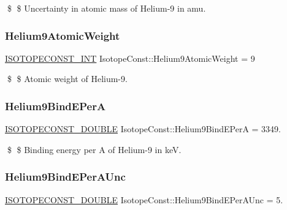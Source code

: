 \$ \$ Uncertainty in atomic mass of Helium-\/9 in amu. \mbox{\label{group___isotope_const-_helium-_he9_ga535bbec4b979be492d664d698eecff00}} 
\subsubsection{\texorpdfstring{Helium9\+Atomic\+Weight}{Helium9AtomicWeight}}
{\footnotesize\ttfamily \mbox{\hyperlink{group___isotope_const-_macros_ga5f18360b3e99483a35c32d789e62621c}{I\+S\+O\+T\+O\+P\+E\+C\+O\+N\+S\+T\+\_\+\+I\+NT}} Isotope\+Const\+::\+Helium9\+Atomic\+Weight = 9}

\$ \$ Atomic weight of Helium-\/9. \mbox{\label{group___isotope_const-_helium-_he9_ga576c43bd65e96ba7d5cce052113aee91}} 
\subsubsection{\texorpdfstring{Helium9\+Bind\+E\+PerA}{Helium9BindEPerA}}
{\footnotesize\ttfamily \mbox{\hyperlink{group___isotope_const-_macros_ga8f45a7272ce02c0b4c65c44636ed719a}{I\+S\+O\+T\+O\+P\+E\+C\+O\+N\+S\+T\+\_\+\+D\+O\+U\+B\+LE}} Isotope\+Const\+::\+Helium9\+Bind\+E\+PerA = 3349.}

\$ \$ Binding energy per A of Helium-\/9 in keV. \mbox{\label{group___isotope_const-_helium-_he9_ga2a83285801fcc98bb19cb62c8fb93713}} 
\subsubsection{\texorpdfstring{Helium9\+Bind\+E\+Per\+A\+Unc}{Helium9BindEPerAUnc}}
{\footnotesize\ttfamily \mbox{\hyperlink{group___isotope_const-_macros_ga8f45a7272ce02c0b4c65c44636ed719a}{I\+S\+O\+T\+O\+P\+E\+C\+O\+N\+S\+T\+\_\+\+D\+O\+U\+B\+LE}} Isotope\+Const\+::\+Helium9\+Bind\+E\+Per\+A\+Unc = 5.}

